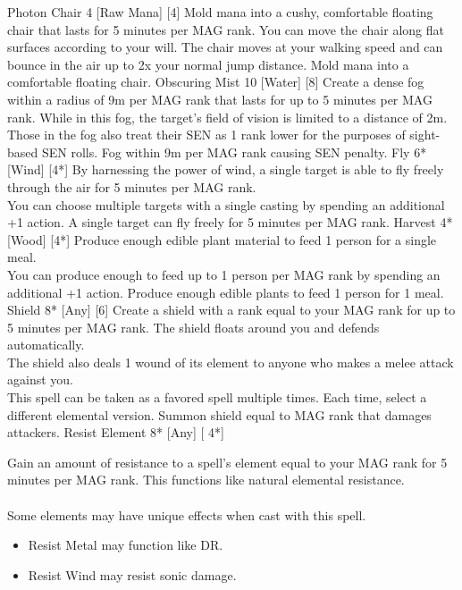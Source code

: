 \begin{pathele}
\spelldescription
{Photon Chair}
{4}
[Raw Mana]
[4]
{Mold mana into a cushy, comfortable floating chair that lasts for 5 minutes per MAG rank. You can move the chair along flat surfaces according to your will. The chair moves at your walking speed and can bounce in the air up to 2x your normal jump distance.}
{Mold mana into a comfortable floating chair.}
\spelldescription
{Obscuring Mist}
{10}
[Water]
[8]
{Create a dense fog within a radius of 9m per MAG rank that lasts for up to 5 minutes per MAG rank. While in this fog, the target's field of vision is limited to a distance of 2m. Those in the fog also treat their SEN as 1 rank lower for the purposes of sight-based SEN rolls.}
{Fog within 9m per MAG rank causing SEN penalty.}
\spelldescription
{Fly}
{6*}
[Wind]
[4*]
{By harnessing the power of wind, a single target is able to fly freely through the air for 5 minutes per MAG rank.\\
You can choose multiple targets with a single casting by spending an additional +1 action.}
{A single target can fly freely for 5 minutes per MAG rank.}
\spelldescription
{Harvest}
{4*}
[Wood]
[4*]
{Produce enough edible plant material to feed 1 person for a single meal.\\You can produce enough to feed up to 1 person per MAG rank by spending an additional +1 action.}
{Produce enough edible plants to feed 1 person for 1 meal.}
\spelldescription
{Shield}
{8*}
[Any]
[6]
{Create a shield with a rank equal to your MAG rank for up to 5 minutes per MAG rank. The shield floats around you and defends automatically.\\The shield also deals 1 wound of its element to anyone who makes a melee attack against you.\\This spell can be taken as a favored spell multiple times. Each time, select a different elemental version.}
{Summon shield equal to MAG rank that damages attackers.}
\spelldescription
{Resist Element}
{8*}
[Any]
[ 4*]
{Gain an amount of resistance to a spell's element equal to your MAG rank for 5 minutes per MAG rank. This functions like natural elemental resistance.\\
\\
Some elements may have unique effects when cast with this spell.
\begin{itemize}
\item Resist Metal may function like DR.
\item Resist Wind may resist sonic damage.

\end{itemize}}
\end{pathele}
